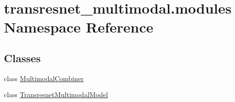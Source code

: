 \hypertarget{namespacetransresnet__multimodal_1_1modules}{}\section{transresnet\+\_\+multimodal.\+modules Namespace Reference}
\label{namespacetransresnet__multimodal_1_1modules}
\subsection*{Classes}
\begin{DoxyCompactItemize}
\item 
class \hyperlink{classtransresnet__multimodal_1_1modules_1_1MultimodalCombiner}{Multimodal\+Combiner}
\item 
class \hyperlink{classtransresnet__multimodal_1_1modules_1_1TransresnetMultimodalModel}{Transresnet\+Multimodal\+Model}
\end{DoxyCompactItemize}
